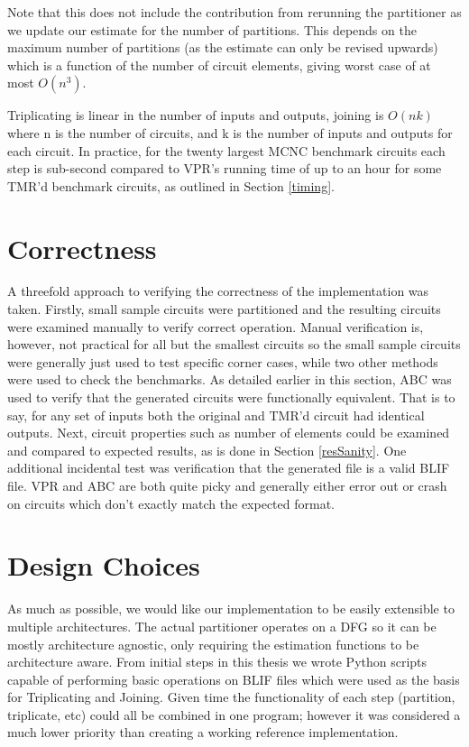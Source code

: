 \documentclass[12pt,final,oneside]{dwThesis} %
\begin{document}
   Note that this does not include the contribution from rerunning the partitioner as we update our estimate for the number of partitions.
   This depends on the maximum number of partitions (as the estimate can only be revised upwards) which is a function of the number of circuit elements,
   giving worst case of at most $O(n^3)$. 
   
   
   Triplicating is linear in the number of
   inputs and outputs, joining is $O(nk)$ where n is the number of circuits,
   and k is the number of inputs and outputs for each circuit.  In practice, for the twenty
   largest \gls{MCNC} benchmark circuits each step is sub-second
   compared to \gls{VPR}'s running time of up to an hour for some \gls{TMR}'d
   benchmark circuits, as outlined in Section \ref{timing}.


   \section{Correctness}\label{secTesting}
   A threefold approach to verifying the correctness of
   the implementation was taken.  Firstly, small sample circuits were
   partitioned and the resulting circuits were examined manually to verify
   correct operation. Manual verification is, however, not practical for all
   but the smallest circuits so the small sample circuits were generally just
   used to test specific corner cases, while two other methods were used to
   check the benchmarks. As detailed earlier in this section, \gls{ABC} was
   used to verify that the generated circuits were functionally equivalent.
   That is to say, for any set of inputs both the original and TMR'd circuit
   had identical outputs.  Next, circuit properties such as number of elements
   could be examined and compared to expected results, as is done in Section
   \ref{resSanity}.  One additional incidental test was verification that the
   generated file is a valid \gls{BLIF} file. \gls{VPR} and \gls{ABC} are both
   quite picky and generally either error out or crash on circuits which don't
   exactly match the expected format.



   \section{Design Choices}
   As much as possible, we would like our
   implementation to be easily extensible to multiple architectures. The actual
   partitioner operates on a \gls{DFG} so it can be mostly architecture
   agnostic, only requiring the estimation functions to be architecture aware.
   From initial steps in this thesis we wrote Python scripts capable of
   performing basic operations on \gls{BLIF} files which were used as the basis
   for Triplicating and Joining. Given time the functionality of each step
   (partition, triplicate, etc) could all be combined in one program; however
   it was considered a much lower priority than creating a working reference
   implementation.
\end{document}
